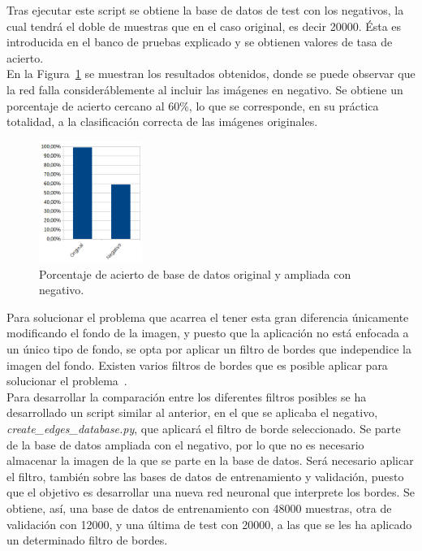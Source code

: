 Tras ejecutar este script se obtiene la base de datos de test con los negativos, la cual tendrá el doble de muestras que en el caso original, es decir 20000. Ésta es introducida en el banco de pruebas explicado y se obtienen valores de tasa de acierto.\\

En la Figura~\ref{fig.neg-orig} se muestran los resultados obtenidos, donde se puede observar que la red falla consideráblemente al incluir las imágenes en negativo. Se obtiene un porcentaje de acierto cercano al 60\%, lo que se corresponde, en su práctica totalidad, a la clasificación correcta de las imágenes originales.

\begin{figure}[H]
	\begin{center}
		\includegraphics[width=0.3\textwidth]{figures/orig_neg}
		\caption{Porcentaje de acierto de base de datos original y ampliada con negativo.}
		\label{fig.neg-orig}
	\end{center}
\end{figure}
\vspace{20pt}

Para solucionar el problema que acarrea el tener esta gran diferencia únicamente modificando el fondo de la imagen, y puesto que la aplicación no está enfocada a un único tipo de fondo, se opta por aplicar un filtro de bordes que independice la imagen del fondo. Existen varios filtros de bordes que es posible aplicar para solucionar el problema~\cite{fundamentos}.\\

Para desarrollar la comparación entre los diferentes filtros posibles se ha desarrollado un script similar al anterior, en el que se aplicaba el negativo, \textit{create\_edges\_database.py}, que aplicará el filtro de borde seleccionado. Se parte de la base de datos ampliada con el negativo, por lo que no es necesario almacenar la imagen de la que se parte en la base de datos. Será necesario aplicar el filtro, también sobre las bases de datos de entrenamiento y validación, puesto que el objetivo es desarrollar una nueva red neuronal que interprete los bordes. Se obtiene, así, una base de datos de entrenamiento con 48000 muestras, otra de validación con 12000, y una última de test con 20000, a las que se les ha aplicado un determinado filtro de bordes.\\

